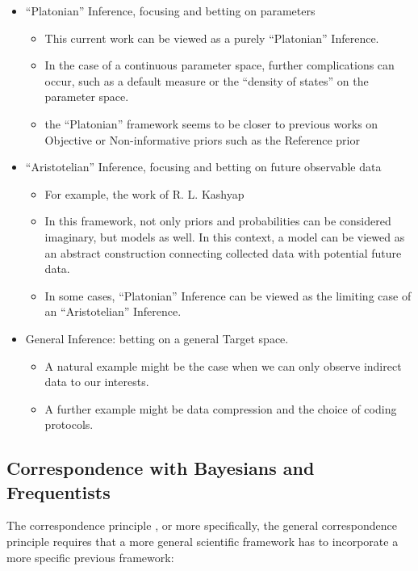 \documentclass{article}
\theoremstyle{definition}
\begin{document}
\begin{itemize}
    \item ``Platonian'' Inference, focusing and betting on parameters
    \begin{itemize}
        \item This current work can be viewed as a purely ``Platonian'' Inference.
        \item In the case of a continuous parameter space, further complications can occur, such as a default measure or the ``density of states'' on the parameter space.
        \item the ``Platonian'' framework seems to be closer to previous works on Objective or Non-informative priors such as the Reference prior \cite{paper:ReferencePrior,book:Bernardo}
    \end{itemize}
    \item ``Aristotelian'' Inference, focusing and betting on future observable data
    \begin{itemize}
        \item For example, the work of R. L. Kashyap \cite{Kashyap1974, Kashyap1971}
        \item In this framework, not only priors and probabilities can be considered imaginary, but models as well. In this context, a model can be viewed as an abstract construction connecting collected data with potential future data.
        \item In some cases, ``Platonian'' Inference can be viewed as the limiting case of an ``Aristotelian'' Inference.
    \end{itemize}
    \item General Inference: betting on a general Target space.
    \begin{itemize}
        \item A natural example might be the case when we can only observe indirect data to our interests.
        \item A further example might be data compression and the choice of coding protocols.
    \end{itemize}
\end{itemize}

\subsection{Correspondence with Bayesians and Frequentists}

The correspondence principle \cite{sep:Correspondence,book:BohrCorrespondence}, or more specifically, the general correspondence principle \cite{sep:Correspondence} requires that a more general scientific framework has to incorporate a more specific previous framework:
\end{document}

